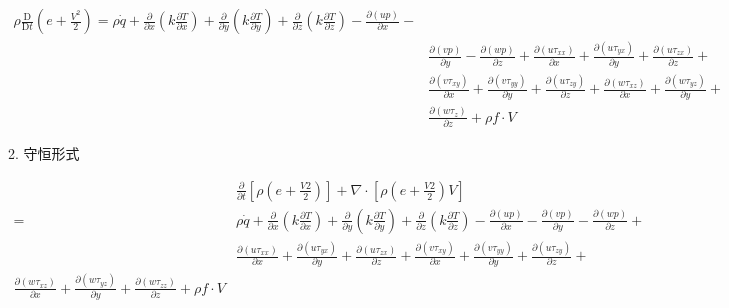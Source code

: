 \documentclass[UTF8]{ctexart}
\begin{document}
$$
	\begin{gathered}
		\rho \frac{\mathrm{D}}{\mathrm{D} t}\left(e+\frac{V^{2}}{2}\right)=\rho \dot{q}+\frac{\partial}{\partial x}\left(k \frac{\partial T}{\partial x}\right)+\frac{\partial}{\partial y}\left(k \frac{\partial T}{\partial y}\right)+\frac{\partial}{\partial z}\left(k \frac{\partial T}{\partial z}\right)-\frac{\partial(u p)}{\partial x}- \\
		& \frac{\partial(v p)}{\partial y}-\frac{\partial(w p)}{\partial z}+\frac{\partial\left(u \tau_{x x}\right)}{\partial x}+\frac{\partial\left(u \tau_{y x}\right)}{\partial y}+\frac{\partial\left(u \tau_{z x}\right)}{\partial z}+ \\
		& \frac{\partial\left(v \tau_{x y}\right)}{\partial x}+\frac{\partial\left(v \tau_{y y}\right)}{\partial y}+\frac{\partial\left(u \tau_{z y}\right)}{\partial z}+\frac{\partial\left(w \tau_{x z}\right)}{\partial x}+\frac{\partial\left(w \tau_{y z}\right)}{\partial y}+ \\
		& \frac{\partial\left(w \tau_{z}\right)}{\partial z}+\rho f \cdot V
	\end{gathered}
$$

2. 守恒形式

$$
	\begin{aligned}
		  & \frac{\partial}{\partial t}\left[\rho\left(e+\frac{V 2}{2}\right)\right]+\nabla \cdot\left[\rho\left(e+\frac{V 2}{2}\right) V\right]                                                                                                                                                                                                     \\
		= & \rho \dot{q}+\frac{\partial}{\partial x}\left(k \frac{\partial T}{\partial x}\right)+\frac{\partial}{\partial y}\left(k \frac{\partial T}{\partial y}\right)+\frac{\partial}{\partial z}\left(k \frac{\partial T}{\partial z}\right)-\frac{\partial(u p)}{\partial x}-\frac{\partial(v p)}{\partial y}-\frac{\partial(w p)}{\partial z}+ \\
		  & \frac{\partial\left(u \tau_{x x}\right)}{\partial x}+\frac{\partial\left(u \tau_{y x}\right)}{\partial y}+\frac{\partial\left(u \tau_{z x}\right)}{\partial z}+\frac{\partial\left(v \tau_{x y}\right)}{\partial x}+\frac{\partial\left(v \tau_{y y}\right)}{\partial y}+\frac{\partial\left(u \tau_{z y}\right)}{\partial z}+           \\
		\frac{\partial\left(w \tau_{x z}\right)}{\partial x}+\frac{\partial\left(w \tau_{y z}\right)}{\partial y}+\frac{\partial\left(w \tau_{z z}\right)}{\partial z}+\rho f \cdot V
	\end{aligned}
$$
\end{document}
